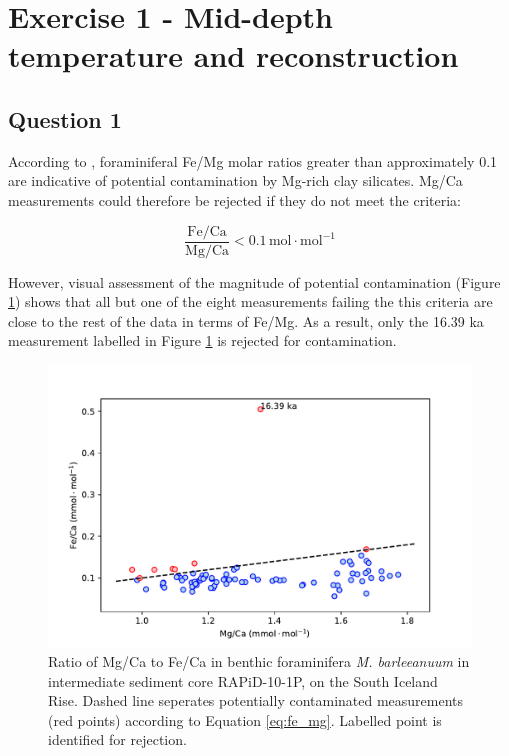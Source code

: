 \section{Exercise 1 - Mid-depth temperature and  reconstruction}

\subsection{Question 1}
\label{sec:Q1}
According to \citeauthor{barker2003study} \parencite{barker2003study}, foraminiferal Fe/Mg molar ratios greater than approximately 0.1 are indicative of potential contamination by Mg-rich clay silicates.
Mg/Ca measurements could therefore be rejected if they do not meet the criteria:

\begin{equation} \label{eq:fe_mg}
    \frac{\mathrm{Fe}/\mathrm{Ca}}{\mathrm{Mg}/\mathrm{Ca}} < 0.1 \, \mathrm{mol \cdot mol^{-1}}
\end{equation}

However, visual assessment of the magnitude of potential contamination (Figure \ref{fig:Mg_Fe}) shows that all but one of the eight measurements failing the this criteria are close to the rest of the data in terms of Fe/Mg.
As a result, only the 16.39 ka measurement labelled in Figure \ref{fig:Mg_Fe} is rejected for contamination.

\begin{figure}[h]
\includegraphics[width=\textwidth]{img/scatter_MgCa_x_FeCa_contaminated.pdf}
    \caption{Ratio of Mg/Ca to Fe/Ca in benthic foraminifera \emph{M. barleeanuum} in intermediate sediment core RAPiD-10-1P, on the South Iceland Rise.
             Dashed line seperates potentially contaminated measurements (red points) according to Equation \ref{eq:fe_mg}.
             Labelled point is identified for rejection.}
        \label{fig:Mg_Fe}
\end{figure}

